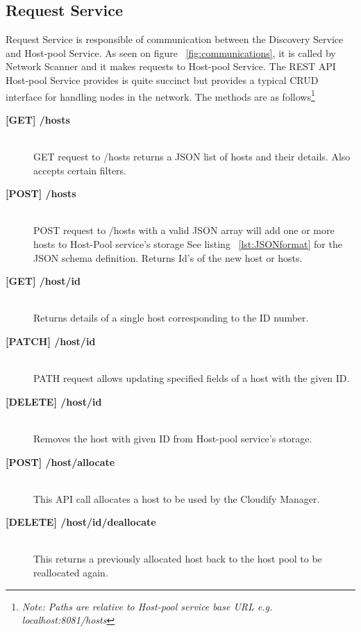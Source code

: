 \subsection{Request Service} \label{requestservice}

Request Service is responsible of communication between the Discovery Service and Host-pool Service. As seen on figure ~\ref{fig:communications}, it is called by Network Scanner and it makes requests to Host-pool Service. The REST API Host-pool Service provides is quite succinct but provides a typical CRUD interface for handling nodes in the network. The methods are as follows\footnote{\textit{Note: Paths are relative to Host-pool service base URL e.g. localhost:8081/hosts}} 

\begin{description}

\item[\textbf{[GET] /hosts}] \hfill \\
GET request to /hosts returns a JSON list of hosts and their details. Also accepts certain filters.

\item[\textbf{[POST] /hosts}] \hfill \\
POST request to /hosts with a valid JSON array will add one or more hosts to Host-Pool service's storage See listing ~\ref{lst:JSONformat} for the JSON schema definition. Returns Id’s of the new host or hosts.

\item[\textbf{[GET] /host/{id}}] \hfill \\
Returns details of a single host corresponding to the ID number.

\item[\textbf{[PATCH] /host/{id}}] \hfill \\
PATH request allows updating specified fields of a host with the given ID.

\item[\textbf{[DELETE] /host/{id}}] \hfill \\
Removes the host with given ID from Host-pool service's storage.

\item[\textbf{[POST] /host/allocate}] \hfill \\
This API call allocates a host to be used by the Cloudify Manager.

\item[\textbf{[DELETE] /host/{id}/deallocate}] \hfill \\
This returns a previously allocated host back to the host pool to be reallocated again.

\end{description}

